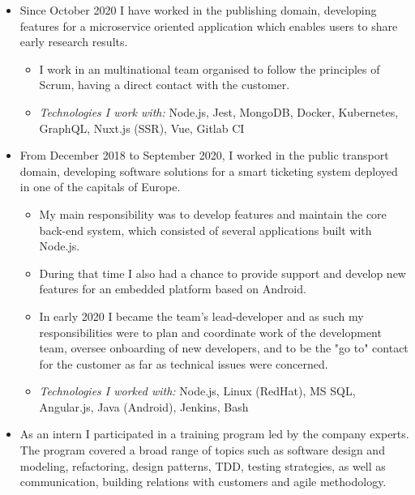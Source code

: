 \documentclass[10pt,a4paper,ragged2e]{altacv}
\begin{document}
\begin{itemize}
    \item Since October 2020 I have worked in the publishing domain, developing features for
    a microservice oriented application which enables users to share early research results.
    \begin{itemize}
        \item I work in an multinational team organised to follow the principles of Scrum,
        having a direct contact with the customer.
        \item \textit{Technologies I work with:} Node.js, Jest, MongoDB, Docker, Kubernetes, GraphQL, Nuxt.js (SSR),
        Vue, Gitlab CI
    \end{itemize}
 \divider
    \item From December 2018 to September 2020, I worked in the public transport domain,
    developing software solutions for a smart ticketing system deployed in one of the capitals of Europe.
    \begin{itemize}
        \item My main responsibility was to develop features and maintain the core back-end system,
        which consisted of several applications built with Node.js.
        \item During that time I also had a chance to provide support and develop new features
        for an embedded platform based on Android.
        \item In early 2020 I became the team’s lead-developer and as such my responsibilities
        were to plan and coordinate work of the development team, oversee onboarding of new
        developers, and to be the "go to" contact for the customer as far as technical
        issues were concerned.
        \item \textit{Technologies I worked with:} Node.js, Linux (RedHat), MS SQL, Angular.js,
        Java (Android), Jenkins, Bash
    \end{itemize}
\end{itemize}

\divider

\begin{itemize}
    \item As an intern I participated in a training program led by the company experts.
    The program covered a broad range of topics such as software design and modeling,
    refactoring, design patterns, TDD, testing strategies, as well as communication,
    building relations with customers and agile methodology.
\end{itemize}
\end{document}
